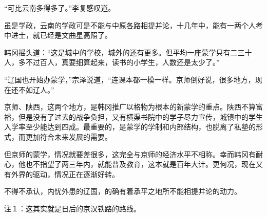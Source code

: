 “可比云南多得多了。”李复感叹道。

虽是学政，云南的学政可是不能与中原各路相提并论，十几年中，能有一两个人考中进士，就已经是文曲星高照了。

韩冈摇头道：“这是城中的学校，城外的还有更多。但平均一座蒙学只有二三十人，多不过百人，真要细算起来，读书的小学生，人数还是太少了。”

“辽国也开始办蒙学，”宗泽说道，“连课本都一模一样。京师倒好说，很多地方，现在还不如辽人。”

京师、陕西，这两个地方，是韩冈推广以格物为根本的新蒙学的重点。陕西不算富裕，但是没有了过去的战争负担，又有横渠书院中的学子尽力宣传，城镇中的学生入学率至少能达到四成。最重要的，是蒙学的学制和内部结构，也脱离了私塾的形式，而更加符合未来发展的需要。

但京师的蒙学，情况就要差很多，这完全与京师的经济水平不相称。幸而韩冈有耐心，他也不指望了两三年内，就能普及教育，这本就是百年大计。更何况，现在又有外界的驱动，情况正在逐渐好转。

不得不承认，内忧外患的辽国，的确有着承平之地所不能相提并论的动力。

注１：这其实就是日后的京汉铁路的路线。
